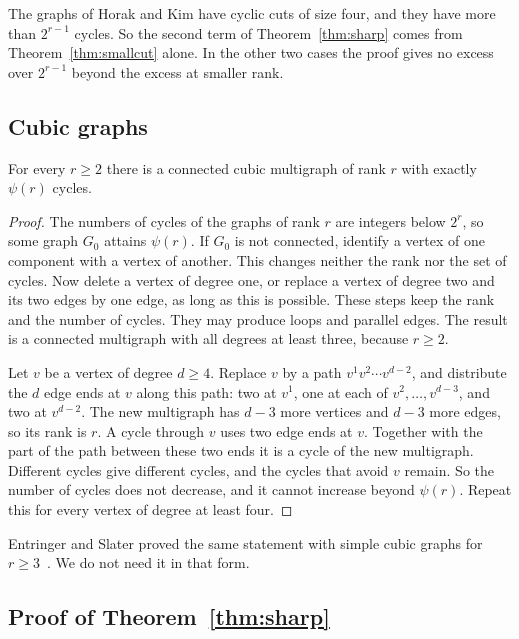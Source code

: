 The graphs of Horak and Kim have cyclic cuts of size four, and they have more than $2^{r-1}$
cycles. So the second term of Theorem~\ref{thm:sharp} comes from Theorem~\ref{thm:smallcut} alone.
In the other two cases the proof gives no excess over $2^{r-1}$ beyond the excess at smaller rank.

\subsection{Cubic graphs}

\begin{lemma}\label{lem:cubic}
For every $r\ge2$ there is a connected cubic multigraph of rank $r$ with exactly $\psi(r)$ cycles.
\end{lemma}

\begin{proof}
The numbers of cycles of the graphs of rank $r$ are integers below $2^{r}$, so some graph $G_0$
attains $\psi(r)$. If $G_0$ is not connected, identify a vertex of one component with a vertex of
another. This changes neither the rank nor the set of cycles. Now delete a vertex of degree one, or
replace a vertex of degree two and its two edges by one edge, as long as this is possible. These
steps keep the rank and the number of cycles. They may produce loops and parallel edges. The result
is a connected multigraph with all degrees at least three, because $r\ge2$.

Let $v$ be a vertex of degree $d\ge4$. Replace $v$ by a path $v^{1}v^{2}\cdots v^{d-2}$, and
distribute the $d$ edge ends at $v$ along this path: two at $v^{1}$, one at each of
$v^{2},\dots,v^{d-3}$, and two at $v^{d-2}$. The new multigraph has $d-3$ more vertices and $d-3$
more edges, so its rank is $r$. A cycle through $v$ uses two edge ends at $v$. Together with the
part of the path between these two ends it is a cycle of the new multigraph. Different cycles give
different cycles, and the cycles that avoid $v$ remain. So the number of cycles does not decrease,
and it cannot increase beyond $\psi(r)$. Repeat this for every vertex of degree at least four.
\end{proof}

Entringer and Slater proved the same statement with simple cubic graphs for $r\ge3$~\cite{ES}. We
do not need it in that form.

\subsection{Proof of Theorem~\ref{thm:sharp}}

